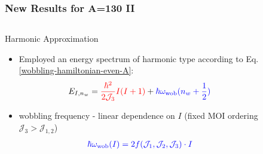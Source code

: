 \documentclass{beamer}
\begin{document}
\begin{frame}
  \frametitle{New Results for A=130 II}
  \begin{columns}
    \begin{column}{0.8\textwidth}
      \begin{alertblock}{Harmonic Approximation}
        \begin{itemize}
          \item Employed an energy spectrum of harmonic type according to Eq. \ref{wobbling-hamiltonian-even-A}:
          \begin{align}
            E_{I,n_w}={\color{red}\frac{\hbar^2}{2\mathcal{J}_3}I(I+1)}+{\color{blue}\hbar\omega_\text{wob}(n_w+\frac{1}{2})}
          \end{align}
          \item wobbling frequency - linear dependence on $I$ (fixed MOI ordering $\mathcal{J}_3>\mathcal{J}_{1,2}$)
          \begin{align}
            {\color{blue}\hbar\omega_\text{wob}(I)=2f(\mathcal{J}_1,\mathcal{J}_2,\mathcal{J}_3)\cdot I}
          \end{align}
        \end{itemize}
      \end{alertblock}
  \end{column}
  \begin{column}{0.2\textwidth}
    \begin{figure}
      \centering

\end{figure}
\end{column}
\end{columns}
\end{frame}
\end{document}
